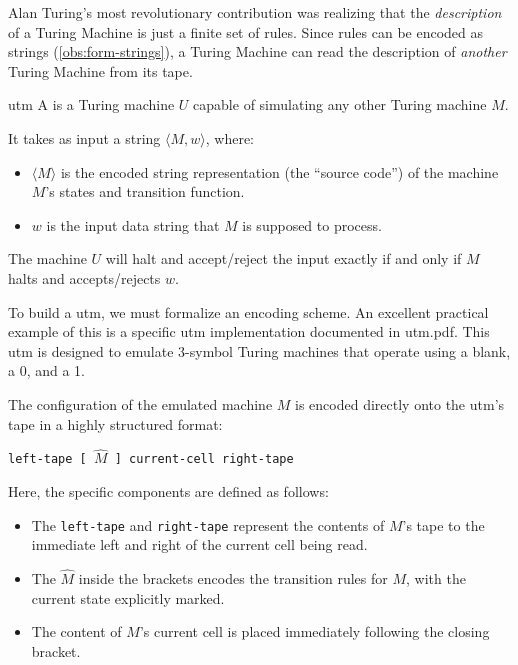 Alan Turing's most revolutionary contribution was realizing that the \textit{description} of a Turing Machine is just a finite set of rules. Since rules can be encoded as strings (\cref{obs:form-strings}), a Turing Machine can read the description of \textit{another} Turing Machine from its tape.

\begin{definition}{}{utm}
    A \textbf{} is a Turing machine \(U\) capable of simulating any other Turing machine \(M\). 
    
    It takes as input a string \(\langle M, w \rangle\), where:
    \begin{itemize}
        \item \(\langle M \rangle\) is the encoded string representation (the ``source code'') of the machine \(M\)'s states and transition function.
        \item \(w\) is the input data string that \(M\) is supposed to process.
    \end{itemize}
    The machine \(U\) will halt and accept/reject the input exactly if and only if \(M\) halts and accepts/rejects \(w\).
\end{definition}

To build a \gls{utm}, we must formalize an encoding scheme. An excellent practical example of this is a specific \gls{utm} implementation documented in utm.pdf. This \gls{utm} is designed to emulate 3-symbol Turing machines that operate using a blank, a 0, and a 1.

The configuration of the emulated machine \(M\) is encoded directly onto the \gls{utm}'s tape in a highly structured format:
\begin{center}
    \texttt{left-tape [ \(\hat{M}\) ] current-cell right-tape}
\end{center}
Here, the specific components are defined as follows:
\begin{itemize}
    \item The \texttt{left-tape} and \texttt{right-tape} represent the contents of \(M\)'s tape to the immediate left and right of the current cell being read.
    \item The \(\hat{M}\) inside the brackets encodes the transition rules for \(M\), with the current state explicitly marked.
    \item The content of \(M\)'s current cell is placed immediately following the closing bracket.
\end{itemize}

